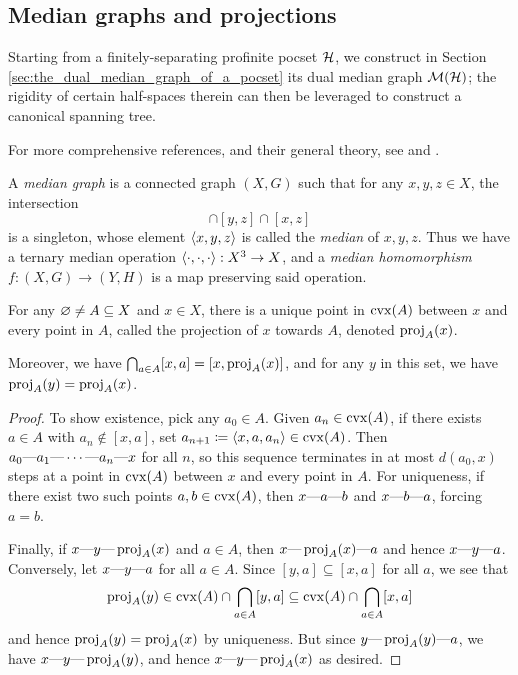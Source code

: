\documentclass[reqno]{amsart}
\begin{document}
    \subsection{Median graphs and projections}

    Starting from a finitely-separating profinite pocset $\mc{H}$, we construct in Section \ref{sec:the_dual_median_graph_of_a_pocset} its dual median graph $\mc{M}(\mc{H})$; the rigidity of certain half-spaces therein can then be leveraged to construct a canonical spanning tree.

    For more comprehensive references, and their general theory, see \cite{Rol98} and \cite{Bow22}.

    \begin{definition}
        A \textit{median graph} is a connected graph $(X,G)$ such that for any $x,y,z\in X$, the intersection
        \begin{equation*}
            [x,y]\cap[y,z]\cap[x,z]
        \end{equation*}
        is a singleton, whose element $\l\langle x,y,z\r\rangle$ is called the \textit{median} of $x,y,z$. Thus we have a ternary median operation $\l\langle\cdot,\cdot,\cdot\r\rangle:X^3\to X$, and a \textit{median homomorphism} $f:(X,G)\to(Y,H)$ is a map preserving said operation.
    \end{definition}

    \begin{lemma}\label{lem:projections}
        For any $\em\neq A\subseteq X$ and $x\in X$, there is a unique point in $\cvx(A)$ between $x$ and every point in $A$, called the $\mathrm{projection}$ of $x$ towards $A$, denoted $\proj_A(x)$.

        Moreover, we have $\bigcap_{a\in A}[x,a]=[x,\proj_A(x)]$, and for any $y$ in this set, we have $\proj_A(y)=\proj_A(x)$.
    \end{lemma}
    \begin{proof}
        To show existence, pick any $a_0\in A$. Given $a_n\in\cvx(A)$, if there exists $a\in A$ with $a_n\not\in[x,a]$, set $a_{n+1}\coloneqq\l\langle x,a,a_n\r\rangle\in\cvx(A)$. Then $a_0\-a_1\-\cdots\-a_n\-x$ for all $n$, so this sequence terminates in at most $d(a_0,x)$ steps at a point in $\cvx(A)$ between $x$ and every point in $A$. For uniqueness, if there exist two such points $a,b\in\cvx(A)$, then $x\-a\-b$ and $x\-b\-a$, forcing $a=b$.

        Finally, if $x\-y\-\proj_A(x)$ and $a\in A$, then $x\-\proj_A(x)\-a$ and hence $x\-y\-a$. Conversely, let $x\-y\-a$ for all $a\in A$. Since $[y,a]\subseteq[x,a]$ for all $a$, we see that
        \begin{equation*}
            \proj_A(y)\in\cvx(A)\cap\bigcap_{a\in A}[y,a]\subseteq\cvx(A)\cap\bigcap_{a\in A}[x,a]
        \end{equation*}
        and hence $\proj_A(y)=\proj_A(x)$ by uniqueness. But since $y\-\proj_A(y)\-a$, we have $x\-y\-\proj_A(y)$, and hence $x\-y\-\proj_A(x)$ as desired.
    \end{proof}
\end{document}
